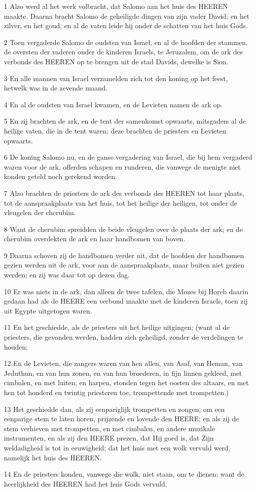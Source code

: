 \par 1 Alzo werd al het werk volbracht, dat Salomo aan het huis des HEEREN maakte. Daarna bracht Salomo de geheiligde dingen van zijn vader David; en het zilver, en het goud, en al de vaten leide hij onder de schatten van het huis Gods.
\par 2 Toen vergaderde Salomo de oudsten van Israel, en al de hoofden der stammen, de oversten der vaderen onder de kinderen Israels, te Jeruzalem, om de ark des verbonds des HEEREN op te brengen uit de stad Davids, dewelke is Sion.
\par 3 En alle mannen van Israel verzamelden zich tot den koning op het feest, hetwelk was in de zevende maand.
\par 4 En al de oudsten van Israel kwamen, en de Levieten namen de ark op.
\par 5 En zij brachten de ark, en de tent der samenkomst opwaarts, mitsgaders al de heilige vaten, die in de tent waren; deze brachten de priesters en Levieten opwaarts.
\par 6 De koning Salomo nu, en de ganse vergadering van Israel, die bij hem vergaderd waren voor de ark, offerden schapen en runderen, die vanwege de menigte niet konden geteld noch gerekend worden.
\par 7 Alzo brachten de priesters de ark des verbonds des HEEREN tot haar plaats, tot de aanspraakplaats van het huis, tot het heilige der heiligen, tot onder de vleugelen der cherubim.
\par 8 Want de cherubim spreidden de beide vleugelen over de plaats der ark; en de cherubim overdekten de ark en haar handbomen van boven.
\par 9 Daarna schoven zij de handbomen verder uit, dat de hoofden der handbomen gezien werden uit de ark, voor aan de aanspraakplaats, maar buiten niet gezien werden; en zij was daar tot op dezen dag.
\par 10 Er was niets in de ark, dan alleen de twee tafelen, die Mozes bij Horeb daarin gedaan had als de HEERE een verbond maakte met de kinderen Israels, toen zij uit Egypte uitgetogen waren.
\par 11 En het geschiedde, als de priesters uit het heilige uitgingen; (want al de priesters, die gevonden werden, hadden zich geheiligd, zonder de verdelingen te houden;
\par 12 En de Levieten, die zangers waren van hen allen, van Asaf, van Heman, van Jeduthun, en van hun zonen, en van hun broederen, in fijn linnen gekleed, met cimbalen, en met luiten, en harpen, stonden tegen het oosten des altaars, en met hen tot honderd en twintig priesteren toe, trompettende met trompetten.)
\par 13 Het geschiedde dan, als zij eenpariglijk trompetten en zongen, om een eenparige stem te laten horen, prijzende en lovende den HEERE; en als zij de stem verhieven met trompetten, en met cimbalen, en andere muzikale instrumenten, en als zij den HEERE prezen, dat Hij goed is, dat Zijn weldadigheid is tot in eeuwigheid; dat het huis met een wolk vervuld werd, namelijk het huis des HEEREN.
\par 14 En de priesters konden, vanwege die wolk, niet staan, om te dienen; want de heerlijkheid des HEEREN had het huis Gods vervuld.

